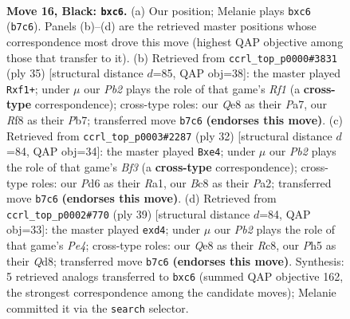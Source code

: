 \documentclass[11pt]{article}
\begin{document}
\clearpage

\begin{figure}[p]\centering
\begin{subfigure}{0.46\textwidth}\centering
\resizebox{\linewidth}{!}{%
\newchessgame
\chessboard[
  setfen={1rb1qrk1/pp1n1pb1/2Pp4/7p/P1PNp2P/6P1/6B1/R1BQK2R b KQ - 0 16},
  showmover=false,
  pgfstyle=straightmove, color=movearrow, markmove={b7-c6}
]}
\caption{}
\end{subfigure}\hfill
\begin{subfigure}{0.46\textwidth}\centering
\resizebox{\linewidth}{!}{%
\newchessgame
\chessboard[
  setfen={4rr1k/pppqb1pp/2np4/3Q4/3PN3/8/PPPB2PP/4RRK1 b - - 7 18},
  showmover=false,
  pgfstyle=straightmove, color=movearrow, markmove={f8-f1}
]}
\caption{}
\end{subfigure}
\\[4pt]
\begin{subfigure}{0.46\textwidth}\centering
\resizebox{\linewidth}{!}{%
\newchessgame
\chessboard[
  setfen={r1bqr1k1/ppp2pbp/3p4/8/3PnB1P/3N1B2/P1PQ2P1/R4RK1 w - - 2 17},
  showmover=false,
  pgfstyle=straightmove, color=movearrow, markmove={f3-e4}
]}
\caption{}
\end{subfigure}\hfill
\begin{subfigure}{0.46\textwidth}\centering
\resizebox{\linewidth}{!}{%
\newchessgame
\chessboard[
  setfen={2rq1rk1/p2n1ppp/3b4/4p2P/3PN1P1/5Q2/PP1B1P2/R3K2R b KQ - 0 20},
  showmover=false,
  pgfstyle=straightmove, color=movearrow, markmove={e5-d4}
]}
\caption{}
\end{subfigure}
\caption{\textbf{Move 16, Black: \texttt{bxc6}.} (a) Our position; Melanie plays \texttt{bxc6} (\texttt{b7c6}). Panels (b)--(d) are the retrieved master positions whose correspondence most drove this move (highest QAP objective among those that transfer to it). (b) Retrieved from \texttt{ccrl\_top\_p0000\#3831} (ply 35) [structural distance $d$=85, QAP obj=38]: the master played \texttt{Rxf1+}; under $\mu$ our \emph{Pb2} plays the role of that game's \emph{Rf1} (a \textbf{cross-type} correspondence); cross-type roles: our \emph{Q}e8 as their \emph{P}a7, our \emph{R}f8 as their \emph{P}b7; transferred move \texttt{b7c6} \textbf{(endorses this move)}. (c) Retrieved from \texttt{ccrl\_top\_p0003\#2287} (ply 32) [structural distance $d$=84, QAP obj=34]: the master played \texttt{Bxe4}; under $\mu$ our \emph{Pb2} plays the role of that game's \emph{Bf3} (a \textbf{cross-type} correspondence); cross-type roles: our \emph{P}d6 as their \emph{R}a1, our \emph{B}c8 as their \emph{P}a2; transferred move \texttt{b7c6} \textbf{(endorses this move)}. (d) Retrieved from \texttt{ccrl\_top\_p0002\#770} (ply 39) [structural distance $d$=84, QAP obj=33]: the master played \texttt{exd4}; under $\mu$ our \emph{Pb2} plays the role of that game's \emph{Pe4}; cross-type roles: our \emph{Q}e8 as their \emph{R}c8, our \emph{P}h5 as their \emph{Q}d8; transferred move \texttt{b7c6} \textbf{(endorses this move)}. Synthesis: 5 retrieved analogs transferred to \texttt{bxc6} (summed QAP objective 162, the strongest correspondence among the candidate moves); Melanie committed it via the \texttt{search} selector.}
\label{fig:thought-m31}
\end{figure}
\end{document}
